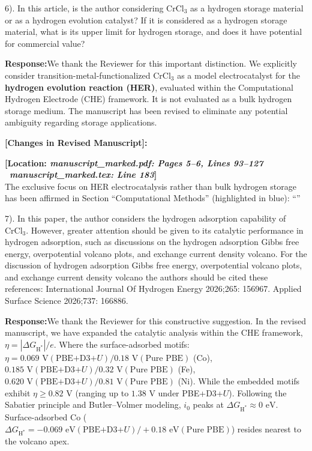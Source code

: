 \documentclass[11pt, sans, a4paper]{moderncv}
\newcommand{\response}{\vspace{0.4em}\noindent\textbf{\color{actionblue}Response:}\hspace{0.5em}}
\newcommand{\manuscriptchange}[1]{{\renewcommand{\label}[1]{}\vspace{0.4em}\noindent\textbf{\color{acsblue}[Changes in Revised Manuscript]:}\par\nopagebreak\vspace{0.15em}#1\vspace{0.4em}}}
\begin{document}
\begin{reviewercomment}
6). In this article, is the author considering $\text{CrCl}_3$ as a hydrogen storage material or as a hydrogen evolution catalyst? If it is considered as a hydrogen storage material, what is its upper limit for hydrogen storage, and does it have potential for commercial value?
\end{reviewercomment}

\response We thank the Reviewer for this important distinction. We explicitly consider transition-metal-functionalized $\text{CrCl}_3$ as a model electrocatalyst for the \textbf{hydrogen evolution reaction (HER)}, evaluated within the Computational Hydrogen Electrode (CHE) framework. It is not evaluated as a bulk hydrogen storage medium. The manuscript has been revised to eliminate any potential ambiguity regarding storage applications.

\manuscriptchange{\textbf{[Location: \textit{manuscript\_marked.pdf: Pages 5--6, Lines 93--127} \textbar\ \textit{manuscript\_marked.tex: Line 183}]}\\ The exclusive focus on HER electrocatalysis rather than bulk hydrogen storage has been affirmed in Section ``Computational Methods'' (highlighted in blue): ``{\itshape \ExecuteMetaData[manuscript_marked.tex]{BasalPlaneSelection}}''}

\vspace{0.8em}

\begin{reviewercomment}
7). In this paper, the author considers the hydrogen adsorption capability of $\text{CrCl}_3$. However, greater attention should be given to its catalytic performance in hydrogen adsorption, such as discussions on the hydrogen adsorption Gibbs free energy, overpotential volcano plots, and exchange current density volcano. For the discussion of hydrogen adsorption Gibbs free energy, overpotential volcano plots, and exchange current density volcano the authors should be cited these references: International Journal Of Hydrogen Energy 2026;265: 156967. Applied Surface Science 2026;737: 166886.
\end{reviewercomment}

\response We thank the Reviewer for this constructive suggestion. In the revised manuscript, we have expanded the catalytic analysis within the CHE framework, $\eta = |\Delta G_{\mathrm{H}^*}|/e$. Where the surface-adsorbed motifs: $\eta = 0.069\text{ V} (\text{PBE+D3+}U) / 0.18\text{ V} (\text{Pure PBE})$ (Co), $0.185\text{ V} (\text{PBE+D3+}U) / 0.32\text{ V} (\text{Pure PBE})$ (Fe), $0.620\text{ V} (\text{PBE+D3+}U) / 0.81\text{ V} (\text{Pure PBE})$ (Ni). While the embedded motifs exhibit $\eta \ge 0.82\text{ V}$ (ranging up to $1.38\text{ V}$ under PBE+D3+$U$). Following the Sabatier principle and Butler--Volmer modeling, $i_0$ peaks at $\Delta G_{\mathrm{H}^*} \approx 0\text{ eV}$. Surface-adsorbed Co ($\Delta G_{\mathrm{H}^*} = -0.069\text{ eV} (\text{PBE+D3+}U) / +0.18\text{ eV} (\text{Pure PBE})$) resides nearest to the volcano apex.
\end{document}
